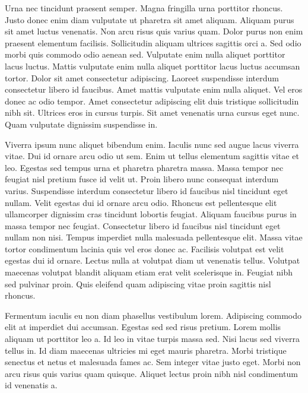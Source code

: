 \documentclass[11pt,a4paper]{article}
\begin{document}
Urna nec tincidunt praesent semper. Magna fringilla urna porttitor rhoncus. Justo donec enim diam vulputate ut pharetra sit amet aliquam. Aliquam purus sit amet luctus venenatis. Non arcu risus quis varius quam. Dolor purus non enim praesent elementum facilisis. Sollicitudin aliquam ultrices sagittis orci a. Sed odio morbi quis commodo odio aenean sed. Vulputate enim nulla aliquet porttitor lacus luctus. Mattis vulputate enim nulla aliquet porttitor lacus luctus accumsan tortor. Dolor sit amet consectetur adipiscing. Laoreet suspendisse interdum consectetur libero id faucibus. Amet mattis vulputate enim nulla aliquet. Vel eros donec ac odio tempor. Amet consectetur adipiscing elit duis tristique sollicitudin nibh sit. Ultrices eros in cursus turpis. Sit amet venenatis urna cursus eget nunc. Quam vulputate dignissim suspendisse in.

Viverra ipsum nunc aliquet bibendum enim. Iaculis nunc sed augue lacus viverra vitae. Dui id ornare arcu odio ut sem. Enim ut tellus elementum sagittis vitae et leo. Egestas sed tempus urna et pharetra pharetra massa. Massa tempor nec feugiat nisl pretium fusce id velit ut. Proin libero nunc consequat interdum varius. Suspendisse interdum consectetur libero id faucibus nisl tincidunt eget nullam. Velit egestas dui id ornare arcu odio. Rhoncus est pellentesque elit ullamcorper dignissim cras tincidunt lobortis feugiat. Aliquam faucibus purus in massa tempor nec feugiat. Consectetur libero id faucibus nisl tincidunt eget nullam non nisi. Tempus imperdiet nulla malesuada pellentesque elit. Massa vitae tortor condimentum lacinia quis vel eros donec ac. Facilisis volutpat est velit egestas dui id ornare. Lectus nulla at volutpat diam ut venenatis tellus. Volutpat maecenas volutpat blandit aliquam etiam erat velit scelerisque in. Feugiat nibh sed pulvinar proin. Quis eleifend quam adipiscing vitae proin sagittis nisl rhoncus.

Fermentum iaculis eu non diam phasellus vestibulum lorem. Adipiscing commodo elit at imperdiet dui accumsan. Egestas sed sed risus pretium. Lorem mollis aliquam ut porttitor leo a. Id leo in vitae turpis massa sed. Nisi lacus sed viverra tellus in. Id diam maecenas ultricies mi eget mauris pharetra. Morbi tristique senectus et netus et malesuada fames ac. Sem integer vitae justo eget. Morbi non arcu risus quis varius quam quisque. Aliquet lectus proin nibh nisl condimentum id venenatis a.
\end{document}
